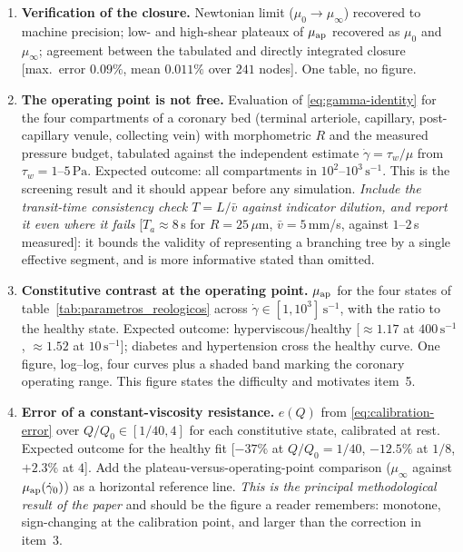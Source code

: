 \documentclass[lineno]{jfm}
\begin{document}
\begin{enumerate}

\item \textbf{Verification of the closure.} Newtonian limit
($\mu_0\!\to\!\mu_\infty$) recovered to machine precision; low- and high-shear
plateaux of $\mu_{\rm ap}$ recovered as $\mu_0$ and $\mu_\infty$; agreement
between the tabulated and directly integrated closure
[max.\ error $0.09\%$, mean $0.011\%$ over $241$ nodes]. One table, no figure.

\item \textbf{The operating point is not free.} Evaluation of
\eqref{eq:gamma-identity} for the four compartments of a coronary bed
(terminal arteriole, capillary, post-capillary venule, collecting vein) with
morphometric $R$ and the measured pressure budget, tabulated against the
independent estimate $\dot{\gamma}=\tau_w/\mu$ from
$\tau_w=1$--$5\,\mathrm{Pa}$. Expected outcome: all compartments in
$10^{2}$--$10^{3}\,\mathrm{s}^{-1}$. This is the screening result and it should
appear before any simulation. \emph{Include the transit-time consistency check
$T=L/\bar{v}$ against indicator dilution, and report it even where it fails}
[$T_a\!\approx\!8\,$s for $R=25\,\mu$m, $\bar v=5\,$mm/s, against $1$--$2\,$s
measured]: it bounds the validity of representing a branching tree by a single
effective segment, and is more informative stated than omitted.

\item \textbf{Constitutive contrast at the operating point.} $\mu_{\rm ap}$ for
the four states of table~\ref{tab:parametros_reologicos} across
$\dot{\gamma}\in[1,10^{3}]\,\mathrm{s}^{-1}$, with the ratio to the healthy state.
Expected outcome: hyperviscous/healthy
[$\approx\!1.17$ at $400\,\mathrm{s}^{-1}$, $\approx\!1.52$ at
$10\,\mathrm{s}^{-1}$]; diabetes and hypertension cross the healthy curve.
One figure, log--log, four curves plus a shaded band marking the coronary
operating range. This figure states the difficulty and motivates item~5.

\item \textbf{Error of a constant-viscosity resistance.} $e(Q)$ from
\eqref{eq:calibration-error} over $Q/Q_0\in[1/40,4]$ for each constitutive state,
calibrated at rest. Expected outcome for the healthy fit
[$-37\%$ at $Q/Q_0=1/40$, $-12.5\%$ at $1/8$, $+2.3\%$ at $4$]. Add the
plateau-versus-operating-point comparison ($\mu_\infty$ against
$\mu_{\rm ap}(\dot{\gamma}_0)$) as a horizontal reference line. \emph{This is the
principal methodological result of the paper} and should be the figure a reader
remembers: monotone, sign-changing at the calibration point, and larger than the
correction in item~3.


\end{enumerate}
\end{document}

